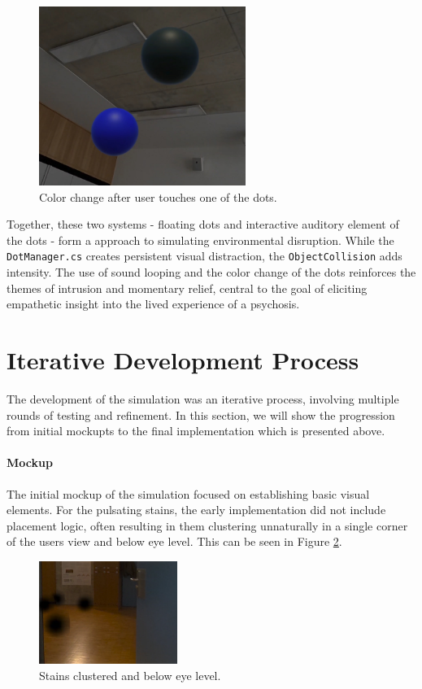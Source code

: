 \begin{figure}[H]
    \centering
    \includegraphics[width=0.6\textwidth]{../../Figures/dots-after-touch.jpg}
    \caption{Color change after user touches one of the dots.}
    \label{fig:dots_after}
\end{figure}

Together, these two systems - floating dots and interactive auditory element of the dots - form a approach to simulating environmental disruption. While the \texttt{DotManager.cs} creates persistent visual distraction, the \texttt{ObjectCollision} adds intensity. The use of sound looping and the color change of the dots reinforces the themes of intrusion and momentary relief, central to the goal of eliciting empathetic insight into the lived experience of a psychosis.

\section{Iterative Development Process}
The development of the simulation was an iterative process, involving multiple rounds of testing and refinement. In this section, we will show the progression from initial mockupts to the final implementation which is presented above.

\paragraph{Mockup}
The initial mockup of the simulation focused on establishing basic visual elements. For the pulsating stains, the early implementation did not include  placement logic, often resulting in them clustering unnaturally in a single corner of the users view and below eye level. This can be seen in Figure \ref{fig:dots_clustered}.

\begin{figure}[H]
    \centering
    \includegraphics[width=0.4\textwidth]{../../Figures/dots-clustered.png}
    \caption{Stains clustered and below eye level.}
    \label{fig:dots_clustered}
\end{figure}


